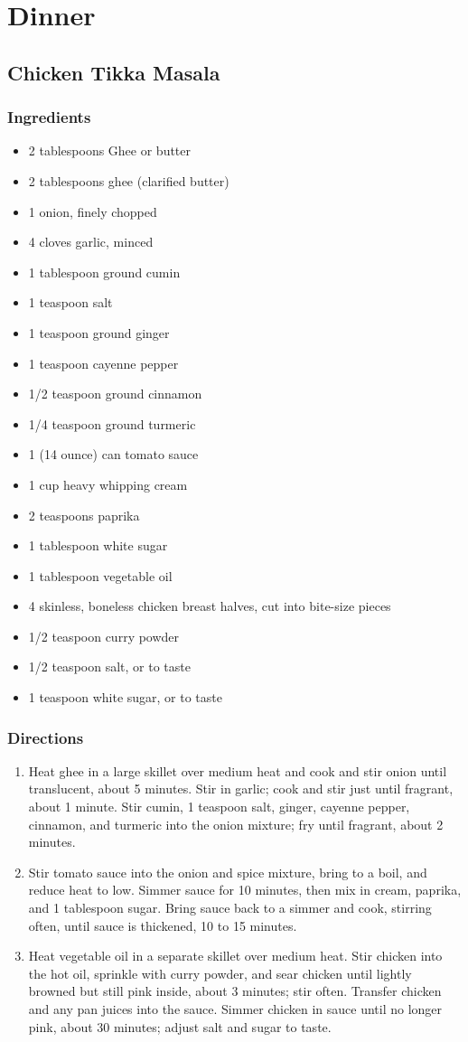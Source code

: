 \documentclass[oneside,11pt]{book}
\newcommand{\Ingredients}[1]{
    \subsection*{Ingredients}
    \begin{itemize} 
        #1 
    \end{itemize}
}
\newcommand{\Directions}[1]{
    \subsection*{Directions}
    \begin{enumerate} 
        #1 
    \end{enumerate}
}
\newcommand{\recipe}[3]{
    \pagebreak
    \section*{ \hspace{-12pt} #1 }
    \addcontentsline{toc}{section}{ \hspace{-6pt} #1 }
    
    \begin{minipage}[t]{0.35\textwidth}
        #2
    \end{minipage}
    \hspace{0.05\textwidth}
    \begin{minipage}[t]{0.6\textwidth}
        #3
    \end{minipage}
}
\begin{document}
\chapter{Dinner}
    \recipe{Chicken Tikka Masala}{
        \Ingredients{
            \item 2 tablespoons Ghee or butter
            \item 2 tablespoons ghee (clarified butter)
            \item 1 onion, finely chopped
            \item 4 cloves garlic, minced
            \item 1 tablespoon ground cumin
            \item 1 teaspoon salt
            \item 1 teaspoon ground ginger
            \item 1 teaspoon cayenne pepper
            \item 1/2 teaspoon ground cinnamon
            \item 1/4 teaspoon ground turmeric
            \item 1 (14 ounce) can tomato sauce
            \item 1 cup heavy whipping cream
            \item 2 teaspoons paprika
            \item 1 tablespoon white sugar
            \item 1 tablespoon vegetable oil
            \item 4 skinless, boneless chicken breast halves, cut into bite-size pieces
            \item 1/2 teaspoon curry powder
            \item 1/2 teaspoon salt, or to taste
            \item 1 teaspoon white sugar, or to taste
        }
    }{
        \Directions{
            \item Heat ghee in a large skillet over medium heat and cook and stir onion until translucent, about 5 minutes. 
                Stir in garlic; cook and stir just until fragrant, about 1 minute. 
                Stir cumin, 1 teaspoon salt, ginger, cayenne pepper, cinnamon, and turmeric into the onion mixture; 
                fry until fragrant, about 2 minutes.
            \item Stir tomato sauce into the onion and spice mixture, bring to a boil, and reduce heat to low.
                Simmer sauce for 10 minutes, then mix in cream, paprika, and 1 tablespoon sugar. 
                Bring sauce back to a simmer and cook, stirring often, until sauce is thickened, 10 to 15 minutes.
            \item Heat vegetable oil in a separate skillet over medium heat. 
                Stir chicken into the hot oil, sprinkle with curry powder, and sear chicken until lightly browned but still pink inside, about 3 minutes; stir often. 
                Transfer chicken and any pan juices into the sauce. 
                Simmer chicken in sauce until no longer pink, about 30 minutes; adjust salt and sugar to taste.
        }
    }
    
\end{document}
